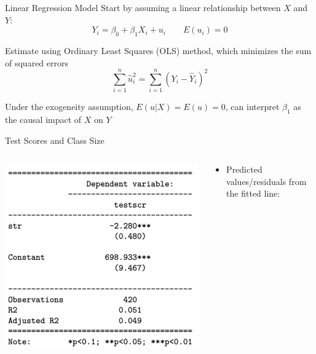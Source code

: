 \documentclass{./../div_teaching_slides}
\begin{document}
\begin{frame}{Linear Regression Model}
Start by assuming a linear relationship between $X$ and $Y$:
$$ Y_i = \beta_0 + \beta_1 X_i + u_i \quad \quad E(u_i) = 0$$
\vspace{-1em}
\begin{witemize}
 \item Estimate using Ordinary Least Squares (OLS) method, which minimizes the sum of squared errors $$\sum_{i=1}^n \hat{u}^2_i = \sum_{i=1}^n(Y_i - \hat{Y}_i)^2$$
\item Under the exogeneity assumption, $E(u|X) = E(u) = 0$, can interpret $\beta_1$ as the causal impact of $X$ on $Y$
\end{witemize}
\end{frame}

\begin{frame}{Test Scores and Class Size}
\small
\vspace{-1em}
\begin{columns}[T]
\begin{column}{0.525\textwidth}
  	\includegraphics[scale=0.375]{reg_output_stargazer.png}
\end{column}	
\begin{column}{0.575\textwidth}
\begin{itemize} 
\item Predicted values/residuals from the fitted line: \vspace{-0.5em}

\end{itemize}
\end{column}
\end{columns}
\end{frame}
\end{document}
